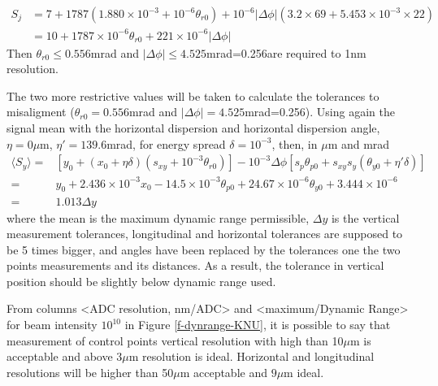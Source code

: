 \begin{align*}
 S_j&=7+1787(1.880\times10^{-3}+10^{-6}\theta_{r0})+10^{-6}|\Delta\phi|(3.2\times69+5.453\times10^{-3}\times22)\\
 &=10+1787\times10^{-6}\theta_{r0}+221\times10^{-6}|\Delta\phi|
\end{align*}
Then $\theta_{r0}\leq 0.556$mrad and $|\Delta\phi|\leq 4.525$mrad=0.256\degre are required to 1nm resolution.\par
The two more restrictive values will be taken to calculate the tolerances to misaligment ($\theta_{r0}= 0.556$mrad and $|\Delta\phi|= 4.525$mrad=0.256\degre).
Using again the signal mean with the horizontal dispersion and horizontal dispersion angle,  $\eta=0\mu$m, $\eta'=139.6$mrad, for energy spread $\delta=10^{-3}$, then, in $\mu$m and mrad
\begin{align*}
  \langle S_y\rangle =& [y_0+(x_0+\eta\delta)(s_{xy}+10^{-3}\theta_{r0})]-10^{-3}\Delta\phi[s_p\theta_{p0}+s_{xy}s_y(\theta_{y0}+\eta'\delta)]\\
 =& y_0+2.436\times10^{-3}x_0-14.5\times10^{-3}\theta_{p0}+24.67\times10^{-6}\theta_{y0}+3.444\times10^{-6}\\
 =&1.013\Delta y
\end{align*}
where the mean is the maximum dynamic range permissible, $\Delta y$ is the vertical measurement tolerances, longitudinal and horizontal tolerances are supposed to be 5 times bigger, and angles have been replaced by the tolerances one the two points measurements and its distances. As a result, the tolerance in vertical position should be slightly below dynamic range used.\par
From columns <ADC resolution, nm/ADC> and <maximum/Dynamic Range> for beam intensity $10^{10}$ in Figure \ref{f-dynrange-KNU}, it is possible to say that measurement of control points vertical resolution with high than 10$\mu$m is acceptable and above $3\mu$m resolution is ideal. Horizontal and longitudinal resolutions will be higher than 50$\mu$m acceptable and $9\mu$m ideal.
